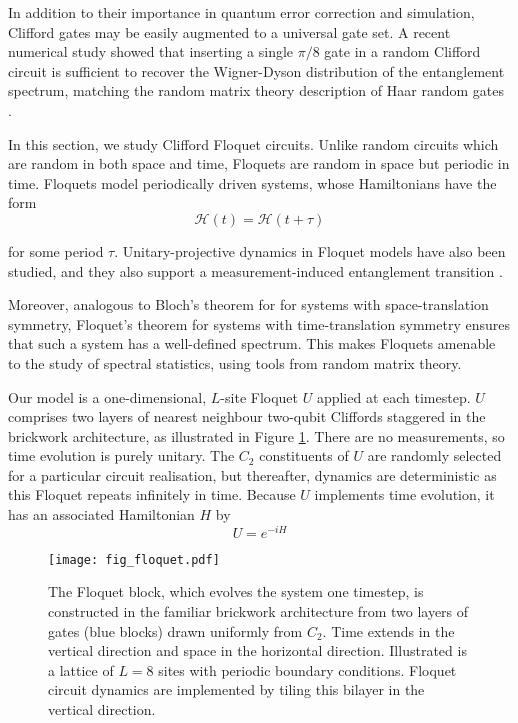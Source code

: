\documentclass[10pt]{article}
\begin{document}
In addition to their importance in quantum error correction and simulation, Clifford gates may be easily augmented to a universal gate set. A recent numerical study showed that inserting a single $\pi/8$ gate in a random Clifford circuit is sufficient to recover the Wigner-Dyson distribution of the entanglement spectrum, matching the random matrix theory description of Haar random gates \cite{zhou2019single}. 

In this section, we study Clifford Floquet circuits. Unlike random circuits which are random in both space and time, Floquets are random in space but periodic in time. Floquets model periodically driven systems, whose Hamiltonians have the form
\begin{equation}
\mathcal{H}(t) = \mathcal{H}(t+\tau)
\end{equation}

for some period $\tau$. Unitary-projective dynamics in Floquet models have also been studied, and they also support a measurement-induced entanglement transition \cite{li2018quantum, skinner2019measurement}.

Moreover, analogous to Bloch's theorem for for systems with space-translation symmetry, Floquet's theorem for systems with time-translation symmetry ensures that such a system has a well-defined spectrum. This makes Floquets amenable to the study of spectral statistics, using tools from random matrix theory.

Our model is a one-dimensional, $L$-site Floquet $U$ applied at each timestep. $U$ comprises two layers of nearest neighbour two-qubit Cliffords staggered in the brickwork architecture, as illustrated in Figure \ref{fig_floquet}. There are no measurements, so time evolution is purely unitary. The $C_2$ constituents of $U$ are randomly selected for a particular circuit realisation, but thereafter, dynamics are deterministic as this Floquet repeats infinitely in time. Because $U$ implements time evolution, it has an associated Hamiltonian $H$ by
\begin{equation}
U = e^{-iH}
\end{equation}

\begin{figure}
\centering
\texttt{[image: fig\_floquet.pdf]}
\caption{The Floquet block, which evolves the system one timestep, is constructed in the familiar brickwork architecture from two layers of gates (blue blocks) drawn uniformly from $C_2$. Time extends in the vertical direction and space in the horizontal direction. Illustrated is a lattice of $L=8$ sites with periodic boundary conditions. Floquet circuit dynamics are implemented by tiling this bilayer in the vertical direction.}
\label{fig_floquet}
\end{figure}
\end{document}
